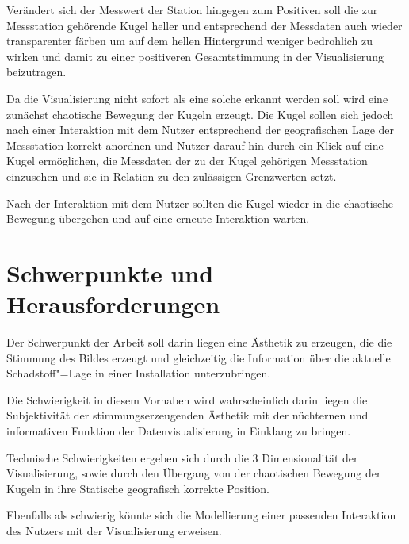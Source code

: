 \documentclass[12pt]{article} %
\begin{document}
Verändert sich der Messwert der Station hingegen zum Positiven soll die zur Messstation gehörende Kugel heller und entsprechend der Messdaten auch wieder transparenter färben um auf dem hellen Hintergrund weniger bedrohlich zu wirken und damit zu einer positiveren Gesamtstimmung in der Visualisierung beizutragen.

Da die Visualisierung nicht sofort als eine solche erkannt werden soll wird eine zunächst chaotische Bewegung der Kugeln erzeugt.
Die Kugel sollen sich jedoch nach einer Interaktion mit dem Nutzer entsprechend der geografischen Lage der Messstation korrekt anordnen und Nutzer darauf hin durch ein Klick auf eine Kugel ermöglichen, die Messdaten der zu der Kugel gehörigen Messstation einzusehen und sie in Relation zu den zulässigen Grenzwerten setzt.

Nach der Interaktion mit dem Nutzer sollten die Kugel wieder in die chaotische Bewegung übergehen und auf eine erneute Interaktion warten.

\section{Schwerpunkte und Herausforderungen} \label{sec:Schwerpunkte}

Der Schwerpunkt der Arbeit soll darin liegen eine Ästhetik zu erzeugen, die die Stimmung des Bildes erzeugt und gleichzeitig die Information über die aktuelle Schadstoff"=Lage in einer Installation unterzubringen.

Die Schwierigkeit in diesem Vorhaben wird wahrscheinlich darin liegen die Subjektivität der stimmungserzeugenden Ästhetik mit der nüchternen und informativen Funktion der Datenvisualisierung in Einklang zu bringen.

Technische Schwierigkeiten ergeben sich durch die 3 Dimensionalität der Visualisierung, sowie durch den Übergang von der chaotischen Bewegung der Kugeln in ihre Statische geografisch korrekte Position.

Ebenfalls als schwierig könnte sich die Modellierung einer passenden Interaktion des Nutzers mit der Visualisierung erweisen.
\end{document}
